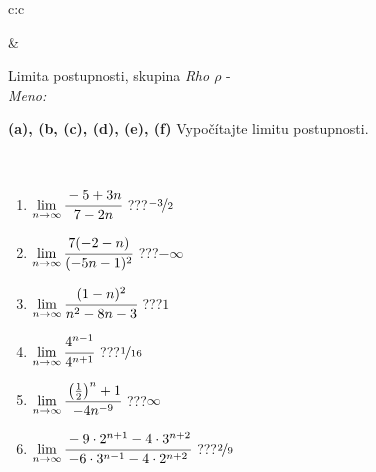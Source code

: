 \documentclass[10pt]{report}
\begin{document}
\begin{tabular}{c:c}
\begin{minipage}[c][104.5mm][t]{0.5\linewidth}
\begin{center}
\begin{minipage}{0.20\linewidth}
\begin{center}
\end{center}
\end{minipage}
\end{center}
\end{minipage}
&
\begin{minipage}[c][104.5mm][t]{0.5\linewidth}
\begin{center}
\vspace{5mm}
{\huge Limita postupnosti, skupina \textit{Rho $\rho$} -}\\[5mm]
\textit{Meno:}\phantom{xxxxxxxxxxxxxxxxxxxxxxxxxxxxxxxxxxxxxxxxxxxxxxxxxxxxxxxxxxxxxxxxx}\\[5mm]
\begin{minipage}{0.95\linewidth}
\begin{center}
{
\textbf{(a), (b, (c), (d), (e), (f)} Vypočítajte limitu postupnosti. \\[-1mm]
\phantom{x}
}
\end{center}
\end{minipage}
\\[1mm]
\begin{minipage}{0.79\linewidth}
\begin{center}
\begin{varwidth}{\linewidth}
\setlength{\itemsep}{0pt}
\begin{enumerate}
\normalsize
\item $\lim\limits_{n\to\infty}\cfrac{-5+3n}{7-2n}$\quad \dotfill\; ???\;\dotfill \quad $\nicefrac{-3}{2}$
\item $\lim\limits_{n\to\infty}\cfrac{7(-2-n)}{(-5n-1)^2}$\quad \dotfill\; ???\;\dotfill \quad $-\infty$
\item $\lim\limits_{n\to\infty}\cfrac{(1-n)^2}{n^2-8n-3}$\quad \dotfill\; ???\;\dotfill \quad $1$
\item $\lim\limits_{n\to\infty}\cfrac{4^{n-1}}{4^{n+1}}$\quad \dotfill\; ???\;\dotfill \quad $\nicefrac{1}{16}$
\item $\lim\limits_{n\to\infty}\cfrac{\left(\frac{1}{2}\right)^n +1}{-4n^{-9}}$\quad \dotfill\; ???\;\dotfill \quad $\infty$
\item $\lim\limits_{n\to\infty}\cfrac{-9\cdot 2^{n+1}-4\cdot 3^{n+2}}{-6\cdot 3^{n-1}-4\cdot 2^{n+2}}$\quad \dotfill\; ???\;\dotfill \quad $\nicefrac{2}{9}$
\end{enumerate}
\end{varwidth}
\end{center}
\end{minipage}
\begin{minipage}{0.20\linewidth}

\end{minipage}
\end{center}
\end{minipage}
\end{tabular}
\end{document}
